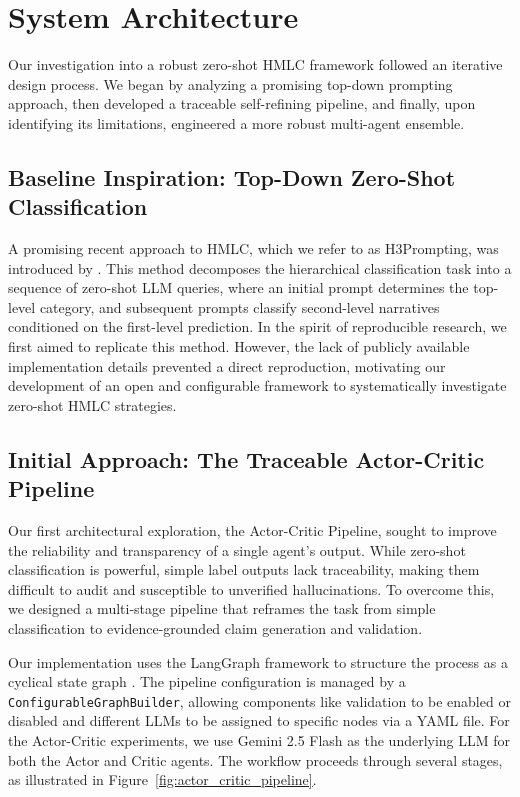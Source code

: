 \section{System Architecture}

Our investigation into a robust zero-shot HMLC framework followed an iterative design process. We began by analyzing a promising top-down prompting approach, then developed a traceable self-refining pipeline, and finally, upon identifying its limitations, engineered a more robust multi-agent ensemble.

\subsection{Baseline Inspiration: Top-Down Zero-Shot Classification}

A promising recent approach to HMLC, which we refer to as H3Prompting, was introduced by \citet{singh-etal-2025-gatenlp}. This method decomposes the hierarchical classification task into a sequence of zero-shot LLM queries, where an initial prompt determines the top-level category, and subsequent prompts classify second-level narratives conditioned on the first-level prediction. In the spirit of reproducible research, we first aimed to replicate this method. However, the lack of publicly available implementation details prevented a direct reproduction, motivating our development of an open and configurable framework to systematically investigate zero-shot HMLC strategies.

\subsection{Initial Approach: The Traceable Actor-Critic Pipeline}

Our first architectural exploration, the Actor-Critic Pipeline, sought to improve the reliability and transparency of a single agent's output. While zero-shot classification is powerful, simple label outputs lack traceability, making them difficult to audit and susceptible to unverified hallucinations. To overcome this, we designed a multi-stage pipeline that reframes the task from simple classification to evidence-grounded claim generation and validation.

Our implementation uses the LangGraph framework to structure the process as a cyclical state graph \citep{langgraph2024}. The pipeline configuration is managed by a \texttt{ConfigurableGraphBuilder}, allowing components like validation to be enabled or disabled and different LLMs to be assigned to specific nodes via a YAML file. For the Actor-Critic experiments, we use Gemini 2.5 Flash as the underlying LLM for both the Actor and Critic agents. The workflow proceeds through several stages, as illustrated in Figure~\ref{fig:actor_critic_pipeline}.

